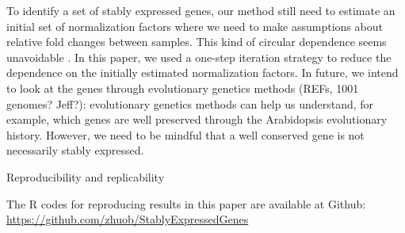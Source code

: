 \documentclass[letterpaper,12pt]{article}
\begin{document}

To identify a set of stably expressed genes, our method still need to estimate
an initial set of normalization factors where we need to make assumptions
about relative fold changes between samples. This kind of circular dependence
seems unavoidable \citep{vandesompele2002accurate}. In this paper, we used a one-step
iteration strategy to reduce the dependence on the initially estimated
normalization factors. In future, we intend to look at the genes through
evolutionary genetics methods (REFs, 1001 genomes? Jeff?): evolutionary genetics methods can
help us understand, for example, which genes are well preserved through the
Arabidopsis evolutionary history. However, we need to be mindful that a well
conserved gene is not necessarily stably expressed. 

Reproducibility and replicability


The R codes for reproducing results in this paper are available at Github:
\url{https://github.com/zhuob/StablyExpressedGenes}



\end{document}
